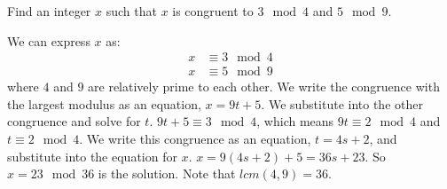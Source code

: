 \question Find an integer $x$ such that $x$ is congruent to $3 \mod 4$ and $5 \mod 9$.
\begin{solution}[.5 in]
We can express $x$ as: 
\begin{align*}
    x &\equiv 3 \mod 4 \\
    x &\equiv 5 \mod 9
\end{align*}
where $4$ and $9$ are relatively prime to each other. We write the congruence with the largest modulus as an equation, $x = 9t + 5$. We substitute into the other congruence and solve for $t$. $9t + 5 \equiv 3 \mod 4$, which means $9t \equiv 2 \mod 4$ and $t \equiv 2 \mod 4$. We write this congruence as an equation, $t = 4s + 2$, and substitute into the equation for $x$. $x = 9(4s + 2) + 5 = 36s + 23$. So $x = 23 \mod 36$ is the solution. Note that $lcm(4, 9) = 36.$ 
\end{solution}
